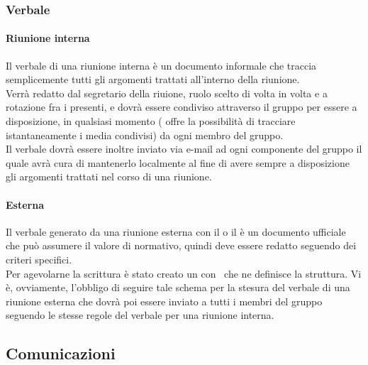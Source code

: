         \subsubsection{Verbale}
          \paragraph{Riunione interna}
            Il verbale di una riunione interna è un documento informale che traccia semplicemente tutti gli argomenti trattati all'interno della riunione.\\
            Verrà redatto dal segretario della riuione, ruolo scelto di volta in volta e a rotazione fra i presenti, e dovrà essere condiviso attraverso il gruppo \textbf{}
            per essere a disposizione, in qualsiasi momento (\textbf{} offre la possibilità di tracciare istantaneamente i media condivisi) da ogni membro del gruppo.\\
            Il verbale dovrà essere inoltre inviato via e-mail ad ogni componente del gruppo il quale avrà cura di mantenerlo localmente al fine di avere sempre a disposizione
            gli argomenti trattati nel corso di una riunione.
          \paragraph{Esterna}
            Il verbale generato da una riunione esterna con il  o il  è un documento ufficiale che può assumere il valore di normativo, quindi deve essere redatto
            seguendo dei criteri specifici.\\
            Per agevolarne la scrittura è stato creato un  con \glossaryItem{\LaTeX}\ che ne definisce la struttura.
            Vi è, ovviamente, l'obbligo di seguire tale schema per la stesura del verbale di una riunione esterna che dovrà poi essere inviato a tutti i membri del gruppo seguendo
            le stesse regole del verbale per una riunione interna.
    \subsection{Comunicazioni}

